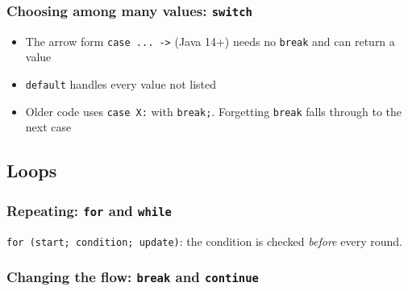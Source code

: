 \documentclass[aspectratio=169,10pt,compress]{beamer}
\begin{document}
\begin{frame}[t,fragile] \frametitle{Choosing among many values: \texttt{switch}}

  \begin{itemize}\small
    \item The arrow form \texttt{case ... ->} (Java 14+) needs no \texttt{break} and can return a value
    \item \texttt{default} handles every value not listed
    \item Older code uses \texttt{case X:} with \texttt{break;}. Forgetting \texttt{break} falls through to the next case
  \end{itemize}
\end{frame}

\subsection[Loops]{Loops}




\begin{frame}[t,fragile] \frametitle{Repeating: \texttt{for} and \texttt{while}}

  \small \texttt{for (start; condition; update)}: the condition is checked \emph{before} every round.
\end{frame}




\begin{frame}[t,fragile] \frametitle{Changing the flow: \texttt{break} and \texttt{continue}}
\end{frame}

\end{document}
